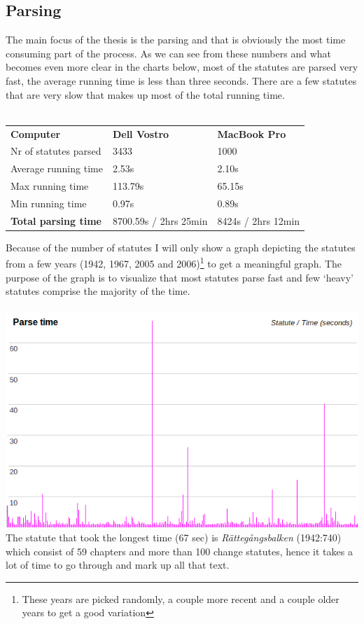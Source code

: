 \subsection{Parsing}
The main focus of the thesis is the parsing and that is obviously the most time consuming part of the process. As we can see from these numbers and what becomes even more clear in the charts below, most of the statutes are parsed very fast, the average running time is less than three seconds. There are a few statutes that are very slow that makes up most of the total running time.\\\\
\begin{tabular}{l l l}
\textbf{Computer} & \textbf{Dell Vostro} & \textbf{MacBook Pro}\\
Nr of statutes parsed & 3433 & 1000\\
Average running time	& 2.53s & 2.10s\\
Max running time &  113.79s & 65.15s\\
Min running time & 0.97s & 0.89s\\
\textbf{Total parsing time} & 8700.59s / 2hrs 25min & 8424s / 2hrs 12min\\
\end{tabular}
\linebreak
\newline
Because of the number of statutes I will only show a graph depicting the statutes from a few years (1942, 1967, 2005 and 2006)\footnote{These years are picked randomly, a couple more recent and a couple older years to get a good variation} to get a meaningful graph. The purpose of the graph is to visualize that most statutes parse fast and few ‘heavy’ statutes comprise the majority of the time.\\\\
\includegraphics[scale=0.6]{../imgs/time_parse1.png}
The statute that took the longest time (67 sec) is \textit{Rättegångsbalken} (1942:740) which consist of 59 chapters and more than 100 change statutes, hence it takes a lot of time to go through and mark up all that text.

